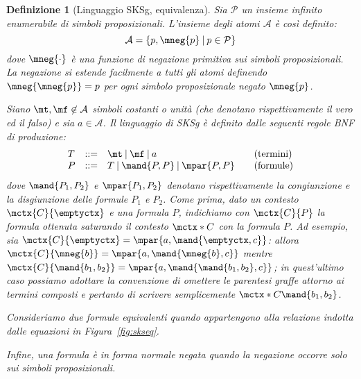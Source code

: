 \documentclass[12pt,a4paper,openright,twoside]{report}
\newtheorem{dfn}[thm]{Definizione}
\begin{document}
\begin{dfn}[Linguaggio \textsf{SKSg}, equivalenza] Sia $\mathcal{P}$ un insieme infinito enumerabile di \emph{simboli proposizionali}. L'insieme degli \emph{atomi} $\mathcal{A}$ \`e cos\`i definito:
$$
	\mathcal{A} = \{p, \mneg{p} \:|\: p \in \mathcal{P} \}
$$
dove $\mneg{\cdot}$ \`e una \emph{funzione di negazione primitiva sui simboli proposizionali}. La negazione si estende facilmente a tutti gli atomi definendo $\mneg{\mneg{p}} = p$ per ogni simbolo proposizionale negato $\mneg{p}$.

Siano $\mt, \mf \not\in \mathcal{A}$ simboli costanti o \emph{unit\`a} (che denotano rispettivamente \emph{il vero} ed \emph{il falso}) e sia $a \in \mathcal{A}$. Il \emph{linguaggio di \textsf{SKSg}} \`e definito dalle seguenti regole BNF di produzione:
$$
\begin{array}{llll}
	T & ::= & \mt \:|\: \mf \:|\: a & \quad\mbox{(termini)} \\
	P & ::= & T \:|\: \mand{P, P} \:|\: \mpar{P, P} & \quad\mbox{(formule)} 
\end{array}
$$
dove $\mand{P_1, P_2}$ e $\mpar{P_1, P_2}$ denotano rispettivamente la \emph{congiunzione} e la \emph{disgiunzione} delle formule $P_1$ e $P_2$. Come prima, dato un contesto $\mctx{C}{\emptyctx}$ e una formula $P$, indichiamo con $\mctx{C}{P}$ la formula ottenuta saturando il contesto $\mctx*{C}$ con la formula $P$. Ad esempio, sia $\mctx{C}{\emptyctx} = \mpar{a, \mand{\emptyctx, c}}$: allora $\mctx{C}{\mneg{b}} = \mpar{a, \mand{\mneg{b}, c}}$ mentre $\mctx{C}{\mand{b_1, b_2}} = \mpar{a, \mand{\mand{b_1, b_2}, c}}$; in quest'ultimo caso possiamo adottare la convenzione di \emph{omettere le parentesi graffe attorno ai termini composti} e pertanto di scrivere semplicemente $\mctx*{C}\mand{b_1, b_2}$.

Consideriamo due formule equivalenti quando appartengono alla relazione indotta dalle equazioni in Figura~\ref{fig:skseq}.

Infine, una formula \`e in \emph{forma normale negata} quando la negazione occorre solo sui simboli proposizionali.
\end{dfn}
\end{document}
